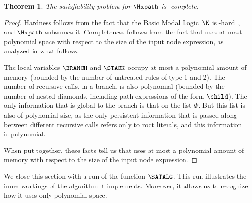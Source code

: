 \documentclass[10pt,a4paper]{amsart}
\newtheorem{thm}{Theorem}[section]
\theoremstyle{definition}
\theoremstyle{remark}
\begin{document}
\begin{thm}
    \label{th:satpspace}
    The satisfiability problem for $\Hxpath$ is \pspace-complete.
\end{thm}
\begin{proof}
    Hardness follows from the fact that the Basic Modal Logic~$\K$ is \pspace-hard~\cite{blackburn2001modal,blackburn06}, and $\Hxpath$ subsumes it. 
    Completeness follows from the fact that  uses at most polynomial space with respect to the size of the input node expression, as analyzed in what follows. 

    The local variables $\BRANCH$ and $\STACK$ occupy at most a polynomial amount of memory (bounded by the number of untreated rules of type 1 and 2).
    The number of recursive calls, in a branch, is also polynomial (bounded by the number of nested diamonds, including path expressions of the form $\child$). 
    The only information that is global to the branch is that on the list $\Phi$.
    But this list is also of polynomial size, as the only persistent information that is passed along between different recursive calls refers only to root literals, and this information is polynomial.

    When put together, these facts tell us that  uses at most a polynomial amount of memory with respect to the size of the input node expression.
\end{proof}


We close this section with a run of the function $\SATALG$.
This run illustrates the inner workings of the algorithm it implements.
Moreover, it allows us to recognize how it uses only polynomial space.
\end{document}
